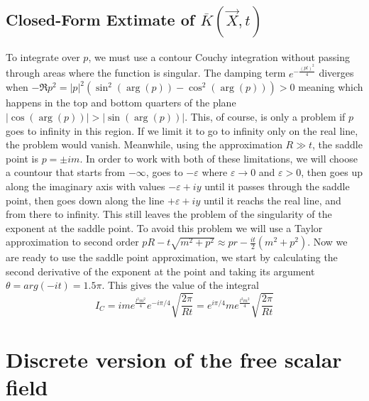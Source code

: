\documentclass{article}
\begin{document}
\subsection{Closed-Form Extimate of $\overline{K}\left(\vec{X}, t\right)$}
To integrate over $p$, we must use a contour Couchy integration without passing through areas where the function is singular. The damping term $e^{-\frac{(pl)^2}{4}}$ diverges when $-\Re{p^2} = |p|^2 (\sin^2(\arg(p)) - \cos^2(\arg(p))) > 0$ meaning which happens in the top and bottom quarters of the plane $|\cos(\arg(p))| > |\sin(\arg(p))|$. This, of course, is only a problem if $p$ goes to infinity in this region. If we limit it to go to infinity only on the real line, the problem would vanish.
\newline
Meanwhile, using the approximation $R \gg t$, the saddle point is $p = \pm im$. In order to work with both of these limitations, we will choose a countour that starts from $-\infty$, goes to $-\varepsilon$ where $\varepsilon\rightarrow0$ and $\varepsilon>0$, then goes up along the imaginary axis with values $-\varepsilon+iy$ until it passes through the saddle point, then goes down along the line $+\varepsilon + iy$ until it reachs the real line, and from there to infinity.
This still leaves the problem of the singularity of the exponent at the saddle point. To avoid this problem we will use a Taylor approximation to second order $pR - t\sqrt{m^2 + p^2} \approx pr - \frac{it}{2}\left(m^2 + p^2\right)$.
Now we are ready to use the saddle point approximation, we start by calculating the second derivative of the exponent at the point and taking its argument $\theta = arg (-it) = 1.5\pi$. This gives the value of the integral
\begin{equation}
    I_C = im e^{\frac{l^2m^2}{4}}e^{-i\pi/4}\sqrt{\frac{2\pi}{Rt}} = e^{i\pi/4} m e^{\frac{l^2m^2}{4}}\sqrt{\frac{2\pi}{Rt}}
\end{equation} 
\section{Discrete version of the free scalar field}
\end{document}
